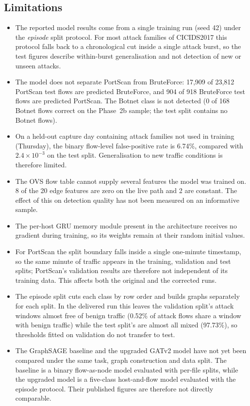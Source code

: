 \documentclass[12pt,a4paper]{report}
\begin{document}
\subsection{Limitations}

\begin{itemize}
    \item {The reported model results come from a single training run (seed 42) under the \emph{episode} split protocol. For most attack families of CICIDS2017 this protocol falls back to a chronological cut inside a single attack burst, so the test figures describe within-burst generalisation and not detection of new or unseen attacks.}
    \item {The model does not separate PortScan from BruteForce: 17{,}909 of 23{,}812 PortScan test flows are predicted BruteForce, and 904 of 918 BruteForce test flows are predicted PortScan. The Botnet class is not detected (0 of 168 Botnet flows correct on the Phase~2b sample; the test split contains no Botnet flows).}
    \item {On a held-out capture day containing attack families not used in training (Thursday), the binary flow-level false-positive rate is 6.74\%, compared with $2.4\times10^{-3}$ on the test split. Generalisation to new traffic conditions is therefore limited.}
    \item {The OVS flow table cannot supply several features the model was trained on. 8 of the 20 edge features are zero on the live path and 2 are constant. The effect of this on detection quality has not been measured on an informative sample.}
    \item {The per-host GRU memory module present in the architecture receives no gradient during training, so its weights remain at their random initial values.}
    \item {For PortScan the split boundary falls inside a single one-minute timestamp, so the same minute of traffic appears in the training, validation and test splits; PortScan's validation results are therefore not independent of its training data. This affects both the original and the corrected runs.}
    \item {The episode split cuts each class by row order and builds graphs separately for each split. In the delivered run this leaves the validation split's attack windows almost free of benign traffic (0.52\% of attack flows share a window with benign traffic) while the test split's are almost all mixed (97.73\%), so thresholds fitted on validation do not transfer to test.}
    \item {The GraphSAGE baseline and the upgraded GATv2 model have not yet been compared under the same task, graph construction and data split. The baseline is a binary flow-as-node model evaluated with per-file splits, while the upgraded model is a five-class host-and-flow model evaluated with the episode protocol. Their published figures are therefore not directly comparable.}
\end{itemize}
\end{document}
